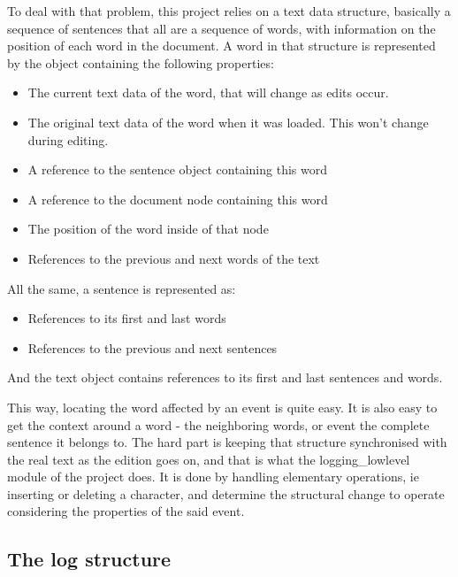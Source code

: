 \documentclass[11pt]{article}
\begin{document}
To deal with that problem, this project relies on a text data structure, 
basically a sequence of sentences that all are a sequence of words, with 
information on the position of each word in the document.
A word in that structure is represented by the object containing the 
following properties:
\begin{itemize}
  \item The current text data of the word, that will change as edits 
  occur.
  \item The original text data of the word when it was loaded. This 
  won't change during editing.
  \item A reference to the sentence object containing this word
  \item A reference to the document node containing this word
  \item The position of the word inside of that node
  \item References to the previous and next words of the text
\end{itemize}

All the same, a sentence is represented as:
\begin{itemize}
  \item References to its first and last words
  \item References to the previous and next sentences
\end{itemize}

And the text object contains references to its first and last 
sentences and words.

This way, locating the word affected by an event is quite easy. It is 
also easy to get the context around a word - the neighboring words, or 
event the complete sentence it belongs to. 
The hard part is keeping that structure synchronised with the real text 
as the edition goes on, and that is what the logging\_lowlevel module 
of the project does. 
It is done by handling elementary operations, ie inserting or deleting 
a character, and determine the structural change to operate considering 
the properties of the said event.

\subsection{The log structure}
\end{document}

